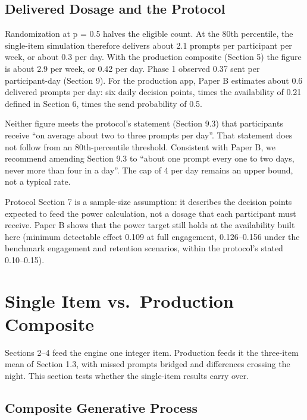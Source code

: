 \documentclass[11pt,letterpaper]{article}
\begin{document}
\subsection{Delivered Dosage and the Protocol}

Randomization at p = 0.5 halves the eligible count. At the 80th percentile, the single-item simulation therefore delivers about 2.1 prompts per participant per week, or about 0.3 per day. With the production composite (Section 5) the figure is about 2.9 per week, or 0.42 per day. Phase 1 observed 0.37 sent per participant-day (Section 9). For the production app, Paper B estimates about 0.6 delivered prompts per day: six daily decision points, times the availability of 0.21 defined in Section 6, times the send probability of 0.5.

Neither figure meets the protocol's statement (Section 9.3) that participants receive ``on average about two to three prompts per day''. That statement does not follow from an 80th-percentile threshold. Consistent with Paper B, we recommend amending Section 9.3 to ``about one prompt every one to two days, never more than four in a day''. The cap of 4 per day remains an upper bound, not a typical rate.

Protocol Section 7 is a sample-size assumption: it describes the decision points expected to feed the power calculation, not a dosage that each participant must receive. Paper B shows that the power target still holds at the availability built here (minimum detectable effect 0.109 at full engagement, 0.126--0.156 under the benchmark engagement and retention scenarios, within the protocol's stated 0.10--0.15).

\section{Single Item vs.\ Production Composite}

Sections 2--4 feed the engine one integer item. Production feeds it the three-item mean of Section 1.3, with missed prompts bridged and differences crossing the night. This section tests whether the single-item results carry over.

\subsection{Composite Generative Process}
\end{document}
